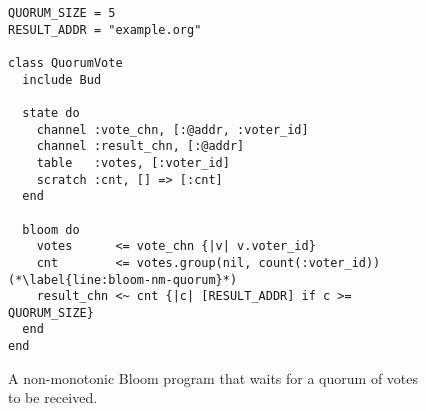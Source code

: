 \begin{figure}[t]
\begin{scriptsize}
\begin{lstlisting}
QUORUM_SIZE = 5
RESULT_ADDR = "example.org"

class QuorumVote
  include Bud

  state do
    channel :vote_chn, [:@addr, :voter_id]
    channel :result_chn, [:@addr]
    table   :votes, [:voter_id]
    scratch :cnt, [] => [:cnt]
  end

  bloom do
    votes      <= vote_chn {|v| v.voter_id}
    cnt        <= votes.group(nil, count(:voter_id)) (*\label{line:bloom-nm-quorum}*)
    result_chn <~ cnt {|c| [RESULT_ADDR] if c >= QUORUM_SIZE}
  end
end
\end{lstlisting}
\end{scriptsize}
\caption{A non-monotonic Bloom program that waits for a quorum of votes to be received.}
\label{fig:bloom-nm-quorum}
\end{figure}
